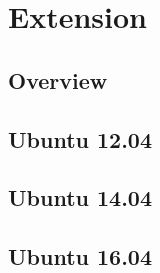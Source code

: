 \part{Extension}


\chapter{Overview}




\chapter{Ubuntu 12.04}






\chapter{Ubuntu 14.04}




\chapter{Ubuntu 16.04}



